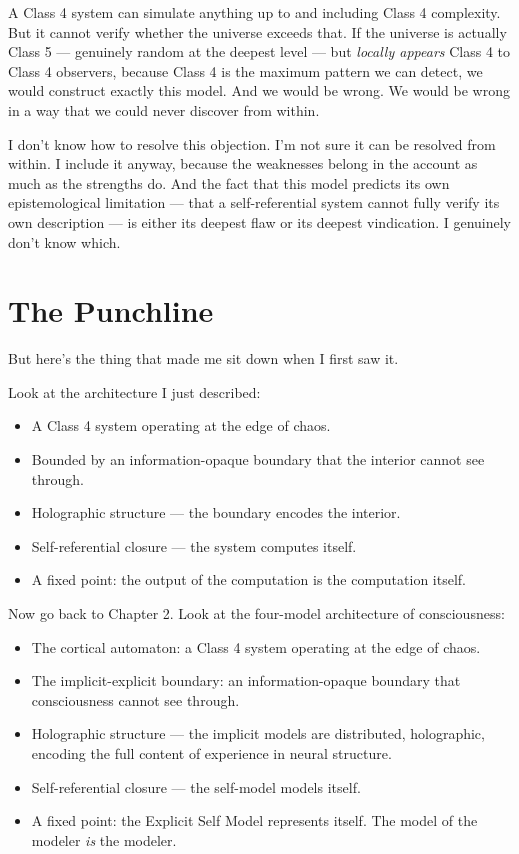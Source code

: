 \documentclass[11pt, twoside, openright]{book}
\begin{document}
A Class 4 system can simulate anything up to and including Class 4 complexity. But it cannot verify whether the universe exceeds that. If the universe is actually Class 5 --- genuinely random at the deepest level --- but \textit{locally appears} Class 4 to Class 4 observers, because Class 4 is the maximum pattern we can detect, we would construct exactly this model. And we would be wrong. We would be wrong in a way that we could never discover from within.

I don't know how to resolve this objection. I'm not sure it can be resolved from within. I include it anyway, because the weaknesses belong in the account as much as the strengths do. And the fact that this model predicts its own epistemological limitation --- that a self-referential system cannot fully verify its own description --- is either its deepest flaw or its deepest vindication. I genuinely don't know which.


\section*{The Punchline}

But here's the thing that made me sit down when I first saw it.

Look at the architecture I just described:

\begin{itemize}
  \item A Class 4 system operating at the edge of chaos.
  \item Bounded by an information-opaque boundary that the interior cannot see through.
  \item Holographic structure --- the boundary encodes the interior.
  \item Self-referential closure --- the system computes itself.
  \item A fixed point: the output of the computation is the computation itself.
\end{itemize}

Now go back to Chapter 2. Look at the four-model architecture of consciousness:

\begin{itemize}
  \item The cortical automaton: a Class 4 system operating at the edge of chaos.
  \item The implicit-explicit boundary: an information-opaque boundary that consciousness cannot see through.
  \item Holographic structure --- the implicit models are distributed, holographic, encoding the full content of experience in neural structure.
  \item Self-referential closure --- the self-model models itself.
  \item A fixed point: the Explicit Self Model represents itself. The model of the modeler \textit{is} the modeler.
\end{itemize}
\end{document}
